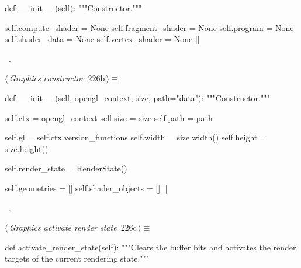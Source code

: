 \documentclass[%
    a4paper,    %
    justified,  %
    nobib,      %
    openany     %
]{tufte-book}
\makeatletter
\renewcommand{\label}[1]{\@tufte@label{##1}}%
\makeatother
\begin{document}
\begin{fullwidth}
\begin{flushleft}
\begin{minipage}{\linewidth}
\begin{pythoncode}
    def __init__(self):
        """Constructor."""

        self.compute_shader  = None
        self.fragment_shader = None
        self.program         = None
        self.shader_data     = None
        self.vertex_shader   = None
|\NWsep|
\end{pythoncode}
\vspace{1.5ex}
\footnotesize
\begin{list}{}{\setlength{\itemsep}{-\parsep}\setlength{\itemindent}{-\leftmargin}}
\item \NWtxtMacroRefIn\ .

\item{}
\end{list}
\end{minipage}\vspace{4ex}
\end{flushleft}
\begin{flushleft} \small
\begin{minipage}{\linewidth}\label{scrap234}\raggedright\small
{} $\langle\,${\itshape Graphics constructor}\nobreak\ {\footnotesize {226b}}$\,\rangle\equiv$
\vspace{-1ex}
\begin{pythoncode}
def __init__(self, opengl_context, size, path="data"):
    """Constructor."""

    self.ctx    = opengl_context
    self.size   = size
    self.path   = path

    self.gl     = self.ctx.version_functions
    self.width  = size.width()
    self.height = size.height()

    self.render_state   = RenderState()

    self.geometries     = []
    self.shader_objects = []
|\NWsep|
\end{pythoncode}
\vspace{1.5ex}
\footnotesize
\begin{list}{}{\setlength{\itemsep}{-\parsep}\setlength{\itemindent}{-\leftmargin}}
\item \NWtxtMacroRefIn\ .

\item{}
\end{list}
\end{minipage}\vspace{4ex}
\end{flushleft}
\begin{flushleft} \small
\begin{minipage}{\linewidth}\label{scrap235}\raggedright\small
{} $\langle\,${\itshape Graphics activate render state}\nobreak\ {\footnotesize {226c}}$\,\rangle\equiv$
\vspace{-1ex}
\begin{pythoncode}
def activate_render_state(self):
    """Clears the buffer bits and activates the render targets of the
    current rendering state."""


\end{pythoncode}
\end{minipage}
\end{flushleft}
\end{fullwidth}
\end{document}
